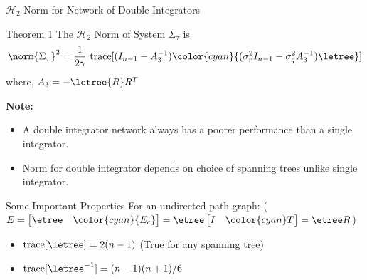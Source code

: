 \begin{frame}{$\mathcal{H}_2$ Norm for Network of Double Integrators}
	\vspace{-0.2cm}
\begin{myblock}{Theorem 1}
	The $\mathcal{H}_2$ Norm of System $\Sigma_{\tau}$ is 
	$$\norm{\Sigma_{\tau}}^2=\frac{1}{2\gamma}\text{ trace}[(I_{n-1}-A_3^{-1})\color{cyan}{(\sigma_r^2I_{n-1}-\sigma_q^2A_3^{-1})\letree}]$$
	where, $A_3 = -\letree{R}R^T$
\end{myblock}
\textbf{Note:} 
\begin{itemize}
	\item A double integrator network always has a poorer performance than a single integrator.
	\item Norm for double integrator depends on choice of spanning trees unlike single integrator.
\end{itemize}
	\begin{block}{Some Important Properties}
	For an undirected path graph: ($E=\begin{bmatrix}\etree & \color{cyan}{E_c}\end{bmatrix}=\etree \begin{bmatrix} I & \color{cyan} T \end{bmatrix}=\etree R$)
	\begin{itemize}
		\item $\text{trace}[\letree]=2(n-1)$ (True for any spanning tree)
		\item $\text{trace}[\letree^{-1}]=(n-1)(n+1)/6$
	\end{itemize}
\end{block}
\end{frame}
